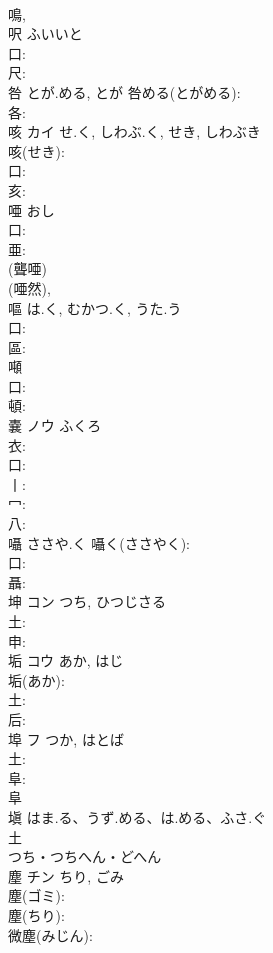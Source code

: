\documentclass[8pt]{extreport}
\begin{document}
\begin{CJK}{UTF8}{min}
\\	鳴, 
\\	呎		ふいいと				
\\	口: 
\\	尺: 
\\	咎		とが.める, とが			咎める(とがめる): 
\\	各: 
\\	咳	カイ	せ.く, しわぶ.く, せき, しわぶき		
\\	咳(せき): 
\\	口: 
\\	亥: 
\\	唖		おし				
\\	口: 
\\	亜: 
\\	(聾唖) 
\\	(唖然), 
\\	嘔		は.く, むかつ.く, うた.う				
\\	口: 
\\	區: 
\\	噸						
\\	口: 
\\	頓: 
\\	嚢	ノウ	ふくろ		
\\	衣: 
\\	口: 
\\	丨: 
\\	冖: 
\\	八: 
\\	囁		ささや.く			囁く(ささやく): 
\\	口: 
\\	聶: 
\\	坤	コン	つち, ひつじさる		
\\	土: 
\\	申: 
\\	垢	コウ	あか, はじ		
\\	垢(あか): 
\\	土: 
\\	后: 
\\	埠	フ	つか, はとば		
\\	土: 
\\	阜: 
\\	阜 
\\	塡		はま.る、うず.める、は.める、ふさ.ぐ		
\\	土	
\\	つち・つちへん・どへん	
\\	塵	チン	ちり, ごみ		
\\	塵(ゴミ): 
\\	塵(ちり): 
\\	微塵(みじん): 

\end{CJK}
\end{document}
